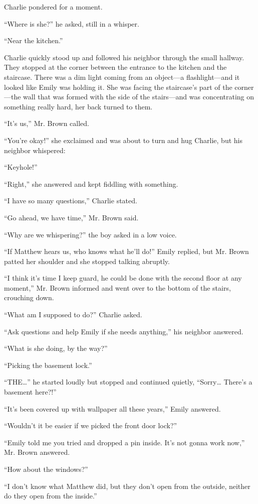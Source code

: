Charlie pondered for a moment.

“Where is she?” he asked, still in a whisper.

“Near the kitchen.”

Charlie quickly stood up and followed his neighbor through the small hallway. They stopped at the corner between the entrance to the kitchen and the staircase. There was a dim light coming from an object—a flashlight—and it looked like Emily was holding it. She was facing the staircase's part of the corner—the wall that was formed with the side of the stairs—and was concentrating on something really hard, her back turned to them.

“It's us,” Mr. Brown called.

“You're okay!” she exclaimed and was about to turn and hug Charlie, but his neighbor whispered:

“Keyhole!”

“Right,” she answered and kept fiddling with something.

“I have so many questions,” Charlie stated.

“Go ahead, we have time,” Mr. Brown said.

“Why are we whispering?” the boy asked in a low voice.

“If Matthew hears us, who knows what he'll do!” Emily replied, but Mr. Brown patted her shoulder and she stopped talking abruptly.

“I think it's time I keep guard, he could be done with the second floor at any moment,” Mr. Brown informed and went over to the bottom of the stairs, crouching down.

“What am I supposed to do?” Charlie asked.

“Ask questions and help Emily if she needs anything,” his neighbor answered.

“What is she doing, by the way?”

“Picking the basement lock.”

“THE…” he started loudly but stopped and continued quietly, “Sorry… There's a basement here?!”

“It's been covered up with wallpaper all these years,” Emily answered.

“Wouldn't it be easier if we picked the front door lock?”

“Emily told me you tried and dropped a pin inside. It's not gonna work now,” Mr. Brown answered.

“How about the windows?”

“I don't know what Matthew did, but they don't open from the outside, neither do they open from the inside.”

